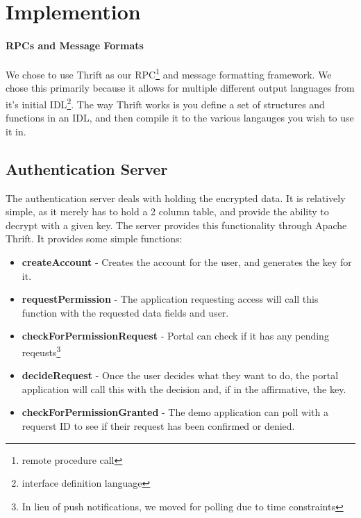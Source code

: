 \documentclass[letterpaper,twocolumn,10pt]{article}
\begin{document}
\section{Implemention}

\paragraph{RPCs and Message Formats}
    We chose to use Thrift\cite{thrift} as our RPC\footnote{remote procedure call} and message formatting framework. We chose this primarily because it allows for multiple different output languages from it's initial IDL\footnote{interface definition language}. The way Thrift works is you define a set of structures and functions in an IDL, and then compile it to the various langauges you wish to use it in. 
    

%

\subsection{Authentication Server}
    The authentication server deals with holding the encrypted data. It is relatively simple, as it merely has to hold a 2 column table, and provide the ability to decrypt with a given key. The server provides this functionality through Apache Thrift\cite{thrift}. It provides some simple functions:
    \begin{itemize}
        \item \textbf{createAccount} - Creates the account for the user, and generates the key for it.
        \item \textbf{requestPermission} - The application requesting access will call this function with the requested data fields and user.
        \item \textbf{checkForPermissionRequest} - Portal can check if it has any pending reqeusts\footnote{In lieu of push notifications, we moved for polling due to time constraints} 
        \item \textbf{decideRequest} - Once the user decides what they want to do, the portal application will call this with the decision and, if in the affirmative, the key.
        \item \textbf{checkForPermissionGranted} - The demo application can poll with a requerst ID to see if their request has been confirmed or denied.
    \end{itemize}
\end{document}
